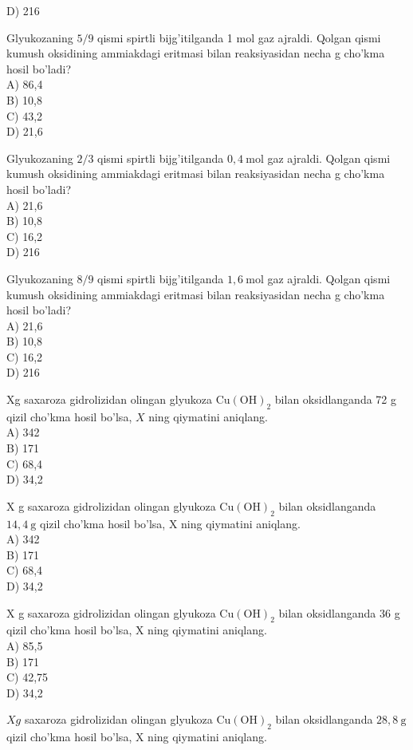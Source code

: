 D) 216
  \item Glyukozaning $5 / 9$ qismi spirtli bijg'itilganda 1 mol gaz ajraldi. Qolgan qismi kumush oksidining ammiakdagi eritmasi bilan reaksiyasidan necha g cho'kma hosil bo'ladi?\\
A) 86,4\\
B) 10,8\\
C) 43,2\\
D) 21,6
  \item Glyukozaning $2 / 3$ qismi spirtli bijg'itilganda $0,4 \mathrm{~mol}$ gaz ajraldi. Qolgan qismi kumush oksidining ammiakdagi eritmasi bilan reaksiyasidan necha g cho'kma hosil bo'ladi?\\
A) 21,6\\
B) 10,8\\
C) 16,2\\
D) 216
  \item Glyukozaning $8 / 9$ qismi spirtli bijg'itilganda $1,6 \mathrm{~mol}$ gaz ajraldi. Qolgan qismi kumush oksidining ammiakdagi eritmasi bilan reaksiyasidan necha g cho'kma hosil bo'ladi?\\
A) 21,6\\
B) 10,8\\
C) 16,2\\
D) 216
  \item Xg saxaroza gidrolizidan olingan glyukoza $\mathrm{Cu}(\mathrm{OH})_{2}$ bilan oksidlanganda 72 g qizil cho'kma hosil bo'lsa, $X$ ning qiymatini aniqlang.\\
A) 342\\
B) 171\\
C) 68,4\\
D) 34,2
  \item X g saxaroza gidrolizidan olingan glyukoza $\mathrm{Cu}(\mathrm{OH})_{2}$ bilan oksidlanganda\\
$14,4 \mathrm{~g}$ qizil cho'kma hosil bo'lsa, X ning qiymatini aniqlang.\\
A) 342\\
B) 171\\
C) 68,4\\
D) 34,2
  \item X g saxaroza gidrolizidan olingan glyukoza $\mathrm{Cu}(\mathrm{OH})_{2}$ bilan oksidlanganda 36 g qizil cho'kma hosil bo'lsa, X ning qiymatini aniqlang.\\
A) 85,5\\
B) 171\\
C) 42,75\\
D) 34,2
  \item $X g$ saxaroza gidrolizidan olingan glyukoza $\mathrm{Cu}(\mathrm{OH})_{2}$ bilan oksidlanganda $28,8 \mathrm{~g}$ qizil cho'kma hosil bo'lsa, X ning qiymatini aniqlang.\\
